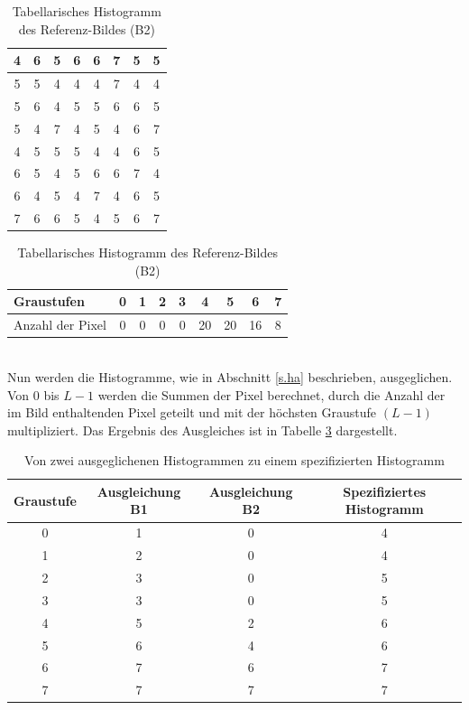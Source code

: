   \begin{table}
  [h]
  \caption{Tabellarisches Histogramm des Referenz-Bildes (B2)}
  \label{tab:b2}
  \centering
  \begin{minipage}{\textwidth}
  \center
  \begin{tabular}{|c|c|c|c|c|c|c|c|}
  \hline
  4&6&5&6&6&7&5&5\\
  \hline
  5&5&4&4&4&7&4&4\\
  \hline
  5&6&4&5&5&6&6&5\\
  \hline
  5&4&7&4&5&4&6&7\\
  \hline
  4&5&5&5&4&4&6&5\\
  \hline
  6&5&4&5&6&6&7&4\\
  \hline
  6&4&5&4&7&4&6&5\\
  \hline
  7&6&6&5&4&5&6&7\\  
  \hline
  \end{tabular}
  \end{minipage}
  \begin{minipage}{\textwidth}
  \hspace{\textwidth}
  \end{minipage}
  \begin{minipage}{\textwidth}
  \center
  \begin{tabular}{|l|c|c|c|c|c|c|c|c|}
  \hline
  Graustufen & 0 & 1 & 2 & 3 & 4 & 5 & 6 & 7\\
  \hline
  Anzahl der Pixel & 0 & 0 & 0 & 0 & 20 & 20 & 16 & 8\\
  \hline
  \end{tabular}
  \end{minipage}
  \end{table}\\
Nun werden die Histogramme, wie in Abschnitt \ref{s.ha} beschrieben, ausgeglichen. Von 0 bis $L-1$ werden die Summen der Pixel berechnet, durch die Anzahl der im Bild enthaltenden Pixel geteilt und mit der höchsten Graustufe $(L-1)$ multipliziert. Das Ergebnis des Ausgleiches ist in Tabelle \ref{tab:hs} dargestellt.
\begin{table}
  [h]
  \caption{Von zwei ausgeglichenen Histogrammen zu einem spezifizierten Histogramm}
  \label{tab:hs}
  \centering
  \begin{tabular}{|c|c|c|c|}
  \hline
  Graustufe & Ausgleichung B1 & Ausgleichung B2 & Spezifiziertes Histogramm\\
  \hline
  0 & 1 & 0 & 4\\
  \hline
  1 & 2 & 0 & 4\\
  \hline
  2 & 3 & 0 & 5\\
  \hline
  3 & 3 & 0 & 5\\
  \hline
  4 & 5 & 2 & 6\\
  \hline
  5 & 6 & 4 & 6\\
  \hline
  6 & 7 & 6 & 7\\
  \hline
  7 & 7 & 7 & 7\\
  \hline
  \end{tabular}
  \end{table}
